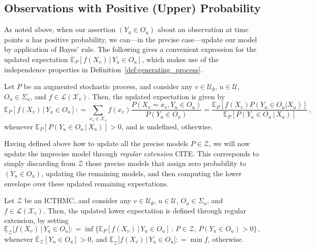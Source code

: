 \documentclass[twoside,11pt]{article}
\newcommand{\states}{\mathcal{X}}
\newcommand{\gambles}{\mathcal{L}}
\newcommand{\coloneqq}{:\!=}
\begin{document}
\subsection{Observations with Positive (Upper) Probability}

As noted above, when our assertion $(Y_u\in O_u)$ about an observation at time points $u$ has positive probability, we can---in the precise case---update our model by application of Bayes' rule. The following gives a convenient expression for the updated expectation $\mathbb{E}_P[f(X_v)\,\vert\,Y_u\in O_u]$, which makes use of the independence properties in Definition~\ref{def:generating_process}.

\begin{proposition}\label{prop:precise_conditioning_for_positive}
Let $P$ be an augmented stochastic process, and consider any $v\in\mathcal{U}_\emptyset$, $u\in\mathcal{U}$, $O_u\in\Sigma_u$, and $f\in\gambles(\states_v)$. Then, the updated expectation is given by
\begin{equation*}
\mathbb{E}_P[f(X_v)\,\vert\,Y_u\in O_u] \coloneqq \sum_{x_v\in\states_v}f(x_v)\frac{P(X_v=x_v, Y_u\in O_u)}{P(Y_u\in O_u)} = \frac{\mathbb{E}_P[f(X_v)P(Y_u\in O_u\vert X_u)]}{\mathbb{E}_P[P(Y_u\in O_u\,\vert\,X_u)]}\,,
\end{equation*}
whenever $\mathbb{E}_P[P(Y_u\in O_u\,\vert\,X_u)]>0$, and is undefined, otherwise.
\end{proposition}

Having defined above how to update all the precise models $P\in\mathcal{Z}$, we will now update the imprecise model through \emph{regular extension} CITE. This corresponds to simply discarding from $\mathcal{Z}$ those precise models that assign zero probability to $(Y_u\in O_u)$, updating the remaining models, and then computing the lower envelope over these updated remaining expectations.

\begin{definition}
Let $\mathcal{Z}$ be an ICTHMC, and consider any $v\in\mathcal{U}_\emptyset$, $u\in\mathcal{U}$, $O_u\in\Sigma_u$, and $f\in\gambles(\states_v)$. Then, the updated lower expectation is defined through regular extension, by setting
\begin{equation*}
\underline{\mathbb{E}}_{\mathcal{Z}}\bigl[f(X_v)\,\vert\,Y_u\in O_u\bigr] \coloneqq \inf\bigl\{ \mathbb{E}_P[f(X_v)\,\vert\,Y_u\in O_u]\,:\, P\in\mathcal{Z},\, P(Y_u\in O_u)>0 \bigr\}\,,
\end{equation*}
whenever $\overline{\mathbb{E}}_\mathcal{Z}[Y_u\in O_u] >0$, and $\underline{\mathbb{E}}_{\mathcal{Z}}\bigl[f(X_v)\,\vert\,Y_u\in O_u\bigr]\coloneqq\min f$, otherwise.
\end{definition}
\end{document}

